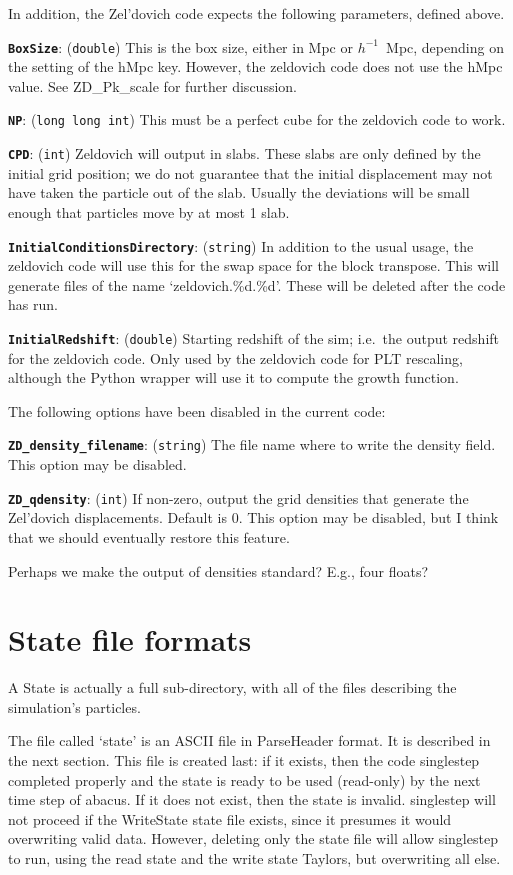 \documentclass[11pt,preprint]{aastex}
\newcommand{\param}[2]{\medskip\noindent\textbf{\texttt{#1}}: ({\tt #2}) }
\newcommand{\todo}{}
\newcommand{\todo}[1]{{\bf TODO: #1}}
\begin{document}
\bigskip

In addition, the Zel'dovich code expects the following parameters, 
defined above.

\param{BoxSize}{double} This is the box size, either in Mpc or $h^{-1}$~Mpc,
depending on the setting of the hMpc key.  However, the zeldovich code does
not use the hMpc value.  See ZD\_Pk\_scale for further discussion.

\param{NP}{long long int} This must be a perfect cube for the zeldovich code to work.

\param{CPD}{int} Zeldovich will output in slabs.  These slabs are only defined by the 
initial grid position; we do not guarantee that the initial displacement may not have
taken the particle out of the slab.  Usually the deviations will be small enough that 
particles move by at most 1 slab.

\param{InitialConditionsDirectory}{string} In addition to the usual usage,
the zeldovich code will use this for the swap space for the block transpose.
This will generate files of the name `zeldovich.\%d.\%d'.  These will be deleted
after the code has run.

\param{InitialRedshift}{double}  Starting redshift of the sim; i.e.~the output redshift for the zeldovich code.  Only used by the zeldovich code for PLT rescaling, although the Python wrapper will use it to compute the growth function.

\bigskip

The following options have been disabled in the current code:

\param{ZD\_density\_filename}{string} The file name where to write the density
field.
\todo{This option may be disabled.}

\param{ZD\_qdensity}{int} If non-zero, output the grid densities that generate
the Zel'dovich displacements.  Default is 0.
\todo{This option may be disabled, but I think that we should eventually restore 
this feature.}

\todo{Perhaps we make the output of densities standard?  E.g., four floats?}

\clearpage

\section{State file formats}

A State is actually a full sub-directory, with all of the files
describing the simulation's particles.

The file called `state' is an ASCII file in ParseHeader format.  It
is described in the next section.  This file is created last: if
it exists, then the code singlestep completed properly and the state
is ready to be used (read-only) by the next time step of abacus.
If it does not exist, then the state is invalid.  singlestep will
not proceed if the WriteState state file exists, since it presumes
it would overwriting valid data.  However, deleting only the state
file will allow singlestep to run, using the read state and the
write state Taylors, but overwriting all else.
\end{document}
